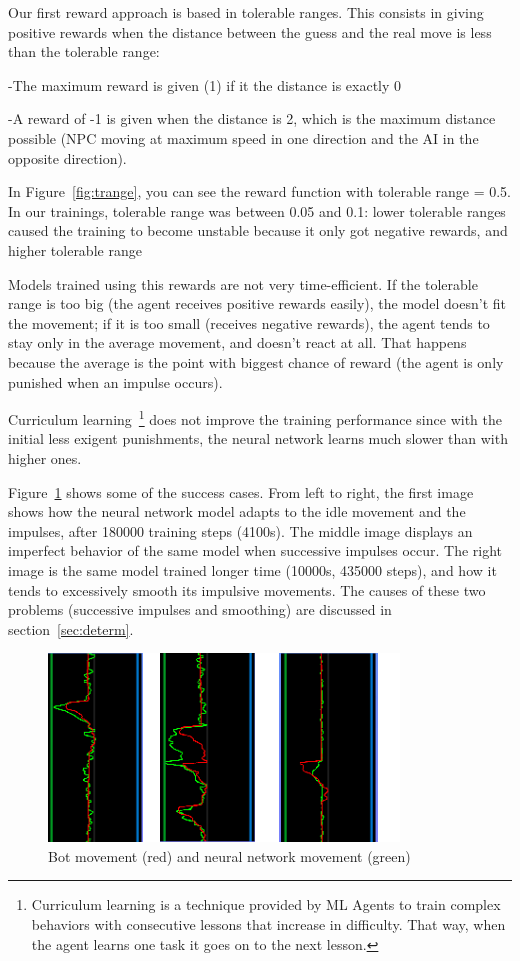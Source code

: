 Our first reward approach is based in tolerable ranges. This consists in giving positive rewards when the distance between the guess and the real move is less than the tolerable range:

-The maximum reward is given (1) if it the distance is exactly 0

-A reward of -1 is given when the distance is 2, which is the maximum distance possible (NPC moving at maximum speed in one direction and the AI in the opposite direction).

In Figure~\ref{fig:trange}, you can see the reward function with tolerable range = 0.5. In our trainings, tolerable range was between 0.05 and 0.1: lower tolerable ranges caused the training to become unstable because it only got negative rewards, and higher tolerable range

Models trained using this rewards are not very time-efficient. If the tolerable range is too big (the agent receives positive rewards easily), the model doesn't fit the movement; if it is too small (receives negative rewards), the agent tends to stay only in the average movement, and doesn't react at all. That happens because the average is the point with biggest chance of reward (the agent is only punished when an impulse occurs). 

Curriculum learning~\footnote{Curriculum learning is a technique provided by ML Agents to train complex behaviors with consecutive lessons that increase in difficulty. That way, when the agent learns one task it goes on to the next lesson.} does not improve the training performance since with the initial less exigent punishments, the neural network learns much slower than with higher ones.

Figure~\ref{fig:graphTR} shows some of the success cases. From left to right, the first image shows how the neural network model adapts to the idle movement and the impulses, after 180000 training steps (4100s). The middle image displays an imperfect behavior of the same model when successive impulses occur. The right image is the same model trained longer time (10000s, 435000 steps), and how it tends to excessively smooth its impulsive movements. The causes of these two problems (successive impulses and smoothing) are discussed in section~\ref{sec:determ}.
\begin{figure}[h]
  \centering
		\includegraphics[width=.9\textwidth]{img/graphsTR.png}
  \caption{Bot movement (red) and neural network movement (green)}
  \label{fig:graphTR}
\end{figure}

